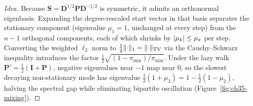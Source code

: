 \begin{proof}[Idea]
Because $\mathbf{S}=\mathbf{D}^{1/2}\mathbf{P}\mathbf{D}^{-1/2}$ is symmetric, it admits an orthonormal eigenbasis. Expanding the degree-rescaled start vector in that basis separates the stationary component (eigenvalue $\mu_1=1$, unchanged at every step) from the $n-1$ orthogonal components, each of which shrinks by $\lvert\mu_k\rvert\le\mu_\star$ per step. Converting the weighted $\ell_2$ norm to $\frac{1}{2}\lVert\cdot\rVert_1=\lVert\cdot\rVert_{\mathrm{TV}}$ via the Cauchy--Schwarz inequality introduces the factor $\frac{1}{2}\sqrt{(1-\pi_{\min})/\pi_{\min}}$. Under the lazy walk $\mathbf{P}'=\tfrac12(\mathbf{I}+\mathbf{P})$, negative eigenvalues near $-1$ map near $0$, so the slowest decaying non-stationary mode has eigenvalue $\tfrac12(1+\mu_2)=1-\tfrac12(1-\mu_2)$, halving the spectral gap while eliminating bipartite oscillation (Figure~\ref{fig:ch35-mixing}).
\end{proof}

